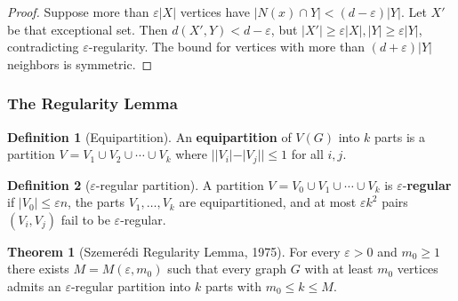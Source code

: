 \documentclass{article}
\theoremstyle{definition}
\newtheorem{theorem}{Theorem}
\newtheorem{definition}{Definition}
\begin{document}
\begin{proof}
Suppose more than $\varepsilon|X|$ vertices have $|N(x) \cap Y| < (d - \varepsilon)|Y|$.
Let $X'$ be that exceptional set. Then $d(X', Y) < d - \varepsilon$, but
$|X'| \ge \varepsilon|X|, |Y| \ge \varepsilon|Y|$, contradicting $\varepsilon$-regularity.
The bound for vertices with more than $(d + \varepsilon)|Y|$ neighbors is
symmetric.
\end{proof}

\subsubsection{The Regularity Lemma}

\begin{definition}[Equipartition]
An \textbf{equipartition} of $V(G)$ into $k$ parts is a partition
$V = V_1 \cup V_2 \cup \cdots \cup V_k$ where $||V_i| - |V_j|| \le 1$
for all $i, j$.
\end{definition}

\begin{definition}[$\varepsilon$-regular partition]
A partition $V = V_0 \cup V_1 \cup \cdots \cup V_k$ is
$\varepsilon$-\textbf{regular} if $|V_0| \le \varepsilon n$, the parts
$V_1, \dots, V_k$ are equipartitioned, and at most $\varepsilon k^2$ pairs
$(V_i, V_j)$ fail to be $\varepsilon$-regular.
\end{definition}

\begin{theorem}[Szemer\'edi Regularity Lemma, 1975]\label{thm:srl}
For every $\varepsilon > 0$ and $m_0 \ge 1$ there exists $M = M(\varepsilon, m_0)$
such that every graph $G$ with at least $m_0$ vertices admits an
$\varepsilon$-regular partition into $k$ parts with $m_0 \le k \le M$.
\end{theorem}
\end{document}
